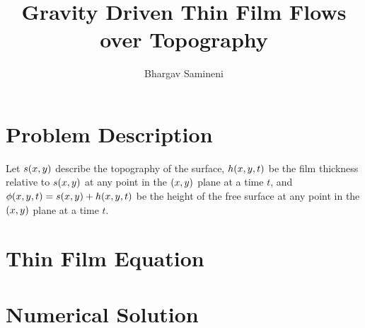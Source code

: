 \documentclass[letterpaper]{article}
\title{Gravity Driven Thin Film Flows over Topography}
\author{Bhargav Samineni}
\date{}
\begin{document}
 
\maketitle

\section{Problem Description}

Let $s\!\left( x, y \right)$ describe the topography of the surface, 
$h\!\left( x,y,t \right)$ be the film thickness relative to $s\!\left( x,y \right)$ at any point in the $\left( x,y \right)$ plane at a time $t$, 
and $\phi\!\left( x,y,t \right) = s\!\left( x,y \right) + h\!\left( x,y,t \right)$ be the height of the free surface at any point in the $\left( x,y \right)$ plane at a time $t$.

\section{Thin Film Equation}


\section{Numerical Solution}

 
\newpage
\printbibliography
\end{document}
